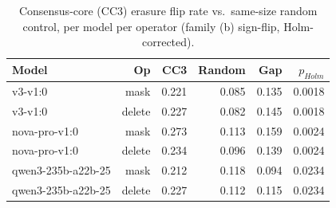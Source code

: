 \begin{table}[t]
\centering
\caption{Consensus-core (CC3) erasure flip rate vs.\ same-size random control, per model per operator (family (b) sign-flip, Holm-corrected).}
\label{tab:erasure}
\begin{tabular}{lrrrrr}
\toprule
Model & Op & CC3 & Random & Gap & $p_{Holm}$ \\
\midrule
v3-v1:0 & mask & 0.221 & 0.085 & 0.135 & 0.0018 \\
v3-v1:0 & delete & 0.227 & 0.082 & 0.145 & 0.0018 \\
nova-pro-v1:0 & mask & 0.273 & 0.113 & 0.159 & 0.0024 \\
nova-pro-v1:0 & delete & 0.234 & 0.096 & 0.139 & 0.0024 \\
qwen3-235b-a22b-25 & mask & 0.212 & 0.118 & 0.094 & 0.0234 \\
qwen3-235b-a22b-25 & delete & 0.227 & 0.112 & 0.115 & 0.0234 \\
\bottomrule
\end{tabular}
\end{table}
